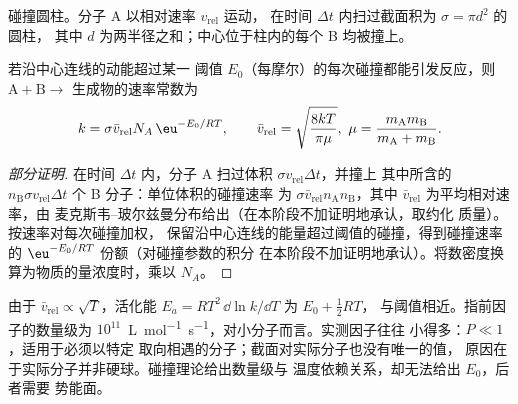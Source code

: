 \begin{omfigure}

{\small 碰撞圆柱。分子 A 以相对速率 $v_{\mathrm{rel}}$ 运动，
在时间 $\Delta t$ 内扫过截面积为 $\sigma = \pi d^2$ 的圆柱，
其中 $d$ 为两半径之和；中心位于柱内的每个 B 均被撞上。}
\end{omfigure}

\begin{theorem}[碰撞理论速率常数]\label{thm:b3:rate-theories:collision}
若沿中心连线的动能超过某一
阈值 $E_0$（每摩尔）的每次碰撞都能引发反应，则 $\mathrm{A + B} \to$
生成物的速率常数为
\[
  k = \sigma\bar v_{\mathrm{rel}}N_A\,\eu^{-E_0/RT}, \qquad \bar v_{\mathrm{rel}} = \sqrt{\frac{8kT}{\pi\mu}},\
  \mu = \frac{m_{\mathrm A}m_{\mathrm B}}{m_{\mathrm A} + m_{\mathrm B}} .
\]
\end{theorem}

\begin{proof}[部分证明]
在时间 $\Delta t$ 内，分子 A 扫过体积 $\sigma v_{\mathrm{rel}}\Delta t$，并撞上
其中所含的 $n_{\mathrm B}\sigma v_{\mathrm{rel}}\Delta t$ 个 B 分子：单位体积的碰撞速率
为 $\sigma\bar v_{\mathrm{rel}}n_{\mathrm A}n_{\mathrm B}$，其中 $\bar v_{\mathrm{rel}}$ 为平均相对速率，由
麦克斯韦–玻尔兹曼分布给出（在本阶段不加证明地承认，取约化
质量）。按速率对每次碰撞加权，
保留沿中心连线的能量超过阈值的碰撞，得到碰撞速率的
$\eu^{-E_0/RT}$ 份额（对碰撞参数的积分
在本阶段不加证明地承认）。将数密度换算为物质的量浓度时，乘以
$N_A$。
\end{proof}

由于 $\bar v_{\mathrm{rel}} \propto \sqrt T$，活化能 $E_a = RT^2\,\dd\ln k/\dd T$ 为 $E_0 + \frac12RT$，
与阈值相近。指前因子的数量级为
$10^{11}$~\unit{L.mol^{-1}.s^{-1}}，对小分子而言。实测因子往往
小得多：$P \ll 1$，适用于必须以特定
取向相遇的分子；截面对实际分子也没有唯一的值，
原因在于实际分子并非硬球。碰撞理论给出数量级与
温度依赖关系，却无法给出 $E_0$，后者需要
势能面。

